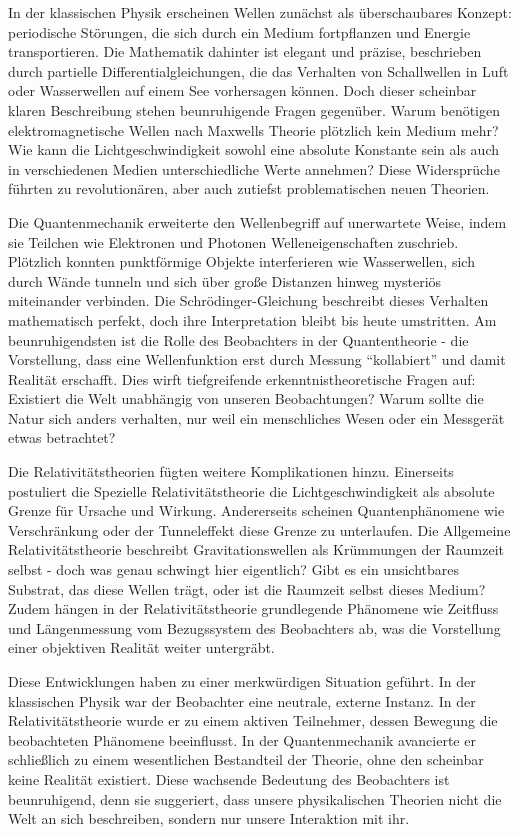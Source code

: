 In der klassischen Physik erscheinen Wellen zunächst als überschaubares Konzept: periodische Störungen, die sich durch ein Medium fortpflanzen und Energie transportieren. Die Mathematik
dahinter ist elegant und präzise, beschrieben durch partielle Differentialgleichungen, die das Verhalten von Schallwellen in Luft oder Wasserwellen auf einem See vorhersagen können.
Doch dieser scheinbar klaren Beschreibung stehen beunruhigende Fragen gegenüber. Warum benötigen elektromagnetische Wellen nach Maxwells Theorie plötzlich kein Medium mehr? Wie kann die
Lichtgeschwindigkeit sowohl eine absolute Konstante sein als auch in verschiedenen Medien unterschiedliche Werte annehmen? Diese Widersprüche führten zu revolutionären, aber auch zutiefst
problematischen neuen Theorien.

Die Quantenmechanik erweiterte den Wellenbegriff auf unerwartete Weise, indem sie Teilchen wie Elektronen und Photonen Welleneigenschaften zuschrieb. Plötzlich konnten punktförmige Objekte
interferieren wie Wasserwellen, sich durch Wände tunneln und sich über große Distanzen hinweg mysteriös miteinander verbinden. Die Schrödinger-Gleichung beschreibt dieses Verhalten mathematisch
perfekt, doch ihre Interpretation bleibt bis heute umstritten. Am beunruhigendsten ist die Rolle des Beobachters in der Quantentheorie - die Vorstellung, dass eine Wellenfunktion erst durch
Messung \enquote{kollabiert} und damit Realität erschafft. Dies wirft tiefgreifende erkenntnistheoretische Fragen auf: Existiert die Welt unabhängig von unseren Beobachtungen? Warum sollte die
Natur sich anders verhalten, nur weil ein menschliches Wesen oder ein Messgerät etwas betrachtet?

Die Relativitätstheorien fügten weitere Komplikationen hinzu. Einerseits postuliert die Spezielle Relativitätstheorie die Lichtgeschwindigkeit als absolute Grenze für Ursache und Wirkung.
Andererseits scheinen Quantenphänomene wie Verschränkung oder der Tunneleffekt diese Grenze zu unterlaufen. Die Allgemeine Relativitätstheorie beschreibt Gravitationswellen als Krümmungen
der Raumzeit selbst - doch was genau schwingt hier eigentlich? Gibt es ein unsichtbares Substrat, das diese Wellen trägt, oder ist die Raumzeit selbst dieses Medium? Zudem hängen in der
Relativitätstheorie grundlegende Phänomene wie Zeitfluss und Längenmessung vom Bezugssystem des Beobachters ab, was die Vorstellung einer objektiven Realität weiter untergräbt.

Diese Entwicklungen haben zu einer merkwürdigen Situation geführt. In der klassischen Physik war der Beobachter eine neutrale, externe Instanz. In der Relativitätstheorie wurde er zu einem
aktiven Teilnehmer, dessen Bewegung die beobachteten Phänomene beeinflusst. In der Quantenmechanik avancierte er schließlich zu einem wesentlichen Bestandteil der Theorie, ohne den scheinbar
keine Realität existiert. Diese wachsende Bedeutung des Beobachters ist beunruhigend, denn sie suggeriert, dass unsere physikalischen Theorien nicht die Welt an sich beschreiben, sondern
nur unsere Interaktion mit ihr.

